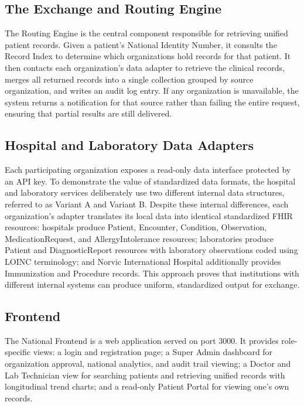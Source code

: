 \documentclass[12pt]{report}
\numberwithin{equation}{chapter}
\begin{document}
\subsection{The Exchange and Routing Engine}
The Routing Engine is the central component responsible for retrieving unified patient records. Given a patient's National Identity Number, it consults the Record Index to determine which organizations hold records for that patient. It then contacts each organization's data adapter to retrieve the clinical records, merges all returned records into a single collection grouped by source organization, and writes an audit log entry. If any organization is unavailable, the system returns a notification for that source rather than failing the entire request, ensuring that partial results are still delivered.

\subsection{Hospital and Laboratory Data Adapters}
Each participating organization exposes a read-only data interface protected by an API key. To demonstrate the value of standardized data formats, the hospital and laboratory services deliberately use two different internal data structures, referred to as Variant A and Variant B. Despite these internal differences, each organization's adapter translates its local data into identical standardized FHIR resources: hospitals produce Patient, Encounter, Condition, Observation, MedicationRequest, and AllergyIntolerance resources; laboratories produce Patient and DiagnosticReport resources with laboratory observations coded using LOINC terminology; and Norvic International Hospital additionally provides Immunization and Procedure records. This approach proves that institutions with different internal systems can produce uniform, standardized output for exchange.

\subsection{Frontend}
The National Frontend is a web application served on port 3000. It provides role-specific views: a login and registration page; a Super Admin dashboard for organization approval, national analytics, and audit trail viewing; a Doctor and Lab Technician view for searching patients and retrieving unified records with longitudinal trend charts; and a read-only Patient Portal for viewing one's own records.
\end{document}
